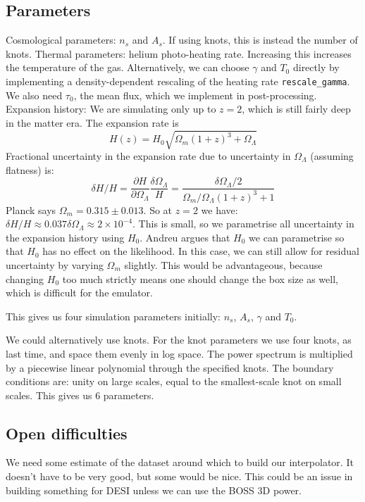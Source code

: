 \documentclass[10pt, aps, prd]{revtex4-1}
\begin{document}
\subsection{Parameters}
Cosmological parameters: $n_s$ and $A_s$. If using knots, this is instead the number of knots.
Thermal parameters: helium photo-heating rate. Increasing this  increases the temperature of the gas. 
Alternatively, we can choose $\gamma$ and $T_0$ directly by implementing a density-dependent rescaling of the heating rate \verb|rescale_gamma|.
We also need $\tau_0$, the mean flux, which we implement in post-processing.
Expansion history: We are simulating only up to $z=2$, which is still fairly deep in the matter era. The expansion rate is
\begin{equation}
 H(z) = H_0 \sqrt{\Omega_m (1+z)^3 + \Omega_\Lambda}
\end{equation}
Fractional uncertainty in the expansion rate due to uncertainty in $\Omega_\Lambda$ (assuming flatness) is:
\begin{equation}
 \delta H / H = \frac{\partial H}{\partial \Omega_\Lambda} \frac{\delta \Omega_\Lambda}{H} = \frac{\delta \Omega_\Lambda /2}{\Omega_m/\Omega_\Lambda (1+z)^3 + 1}
\end{equation}
Planck says $\Omega_m = 0.315 \pm 0.013$. So at $z=2$ we have: $\delta H /H \approx 0.037 \delta \Omega_\Lambda \approx 2\times 10^{-4}$. 
This is small, so we parametrise all uncertainty in the expansion history using $H_0$. Andreu argues that $H_0$ we can parametrise so that
$H_0$ has no effect on the likelihood. In this case, we can still allow for residual uncertainty by varying $\Omega_m$ slightly. This
would be advantageous, because changing $H_0$ too much strictly means one should change the box size as well, which is difficult for 
the emulator.

This gives us four simulation parameters initially: $n_s$, $A_s$, $\gamma$ and $T_0$. 

We could alternatively use knots. For the knot parameters we use four knots, as last time, and space them evenly in log space. 
The power spectrum is multiplied by a piecewise linear polynomial through the specified knots. The boundary conditions are: 
unity on large scales, equal to the smallest-scale knot on small scales. This gives us $6$ parameters.

\subsection{Open difficulties}

We need some estimate of the dataset around which to build our interpolator. It doesn't have to be very good, but some would be nice. This could
be an issue in building something for DESI unless we can use the BOSS 3D power.


\end{document}
